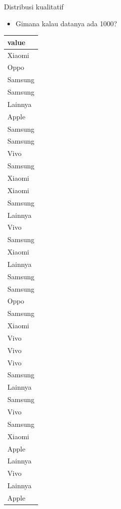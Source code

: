 \documentclass[
  ignorenonframetext,
]{beamer}
\providecommand{\tightlist}{%
  \setlength{\itemsep}{0pt}\setlength{\parskip}{0pt}}\usepackage{longtable,booktabs,array}
\begin{document}
\begin{frame}[s]{Distribusi kualitatif}
\label{distribusi-kualitatif-1}
\begin{itemize}
\tightlist
\item
  Gimana kalau datanya ada 1000?
\end{itemize}

\begin{table}
\centering
\begin{tabular}[t]{l}
\hline
value\\
\hline
Xiaomi\\
\hline
Oppo\\
\hline
Samsung\\
\hline
Samsung\\
\hline
Lainnya\\
\hline
Apple\\
\hline
Samsung\\
\hline
Samsung\\
\hline
Vivo\\
\hline
Samsung\\
\hline
Xiaomi\\
\hline
Xiaomi\\
\hline
Samsung\\
\hline
Lainnya\\
\hline
Vivo\\
\hline
Samsung\\
\hline
Xiaomi\\
\hline
Lainnya\\
\hline
Samsung\\
\hline
Samsung\\
\hline
Oppo\\
\hline
Samsung\\
\hline
Xiaomi\\
\hline
Vivo\\
\hline
Vivo\\
\hline
Vivo\\
\hline
Samsung\\
\hline
Lainnya\\
\hline
Samsung\\
\hline
Vivo\\
\hline
Samsung\\
\hline
Xiaomi\\
\hline
Apple\\
\hline
Lainnya\\
\hline
Vivo\\
\hline
Lainnya\\
\hline
Apple\\

\end{tabular}
\end{table}
\end{frame}
\end{document}
